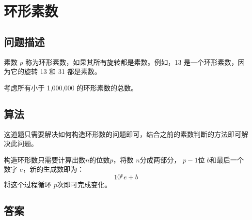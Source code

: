 \section{环形素数}
\subsection{问题描述}
\begin{tcolorbox}

素数 \( p \) 称为环形素数，如果其所有旋转都是素数。例如，13 是一个环形素数，因为它的旋转 13 和 31 都是素数。

考虑所有小于 1,000,000 的环形素数的总数。
\end{tcolorbox}

\subsection{算法}
这道题只需要解决如何构造环形数的问题即可，结合之前的素数判断的方法即可解决此问题。

构造环形数只需要计算出数$n$的位数$p$，将数 \( n \)分成两部分， \( p - 1 \)位 \( b \)和最后一个数字 \( e \)，新的生成数即为：
\begin{equation*}
 10^pe + b
\end{equation*}
将这个过程循环 \( p \)次即可完成变化。


\subsection{答案}
